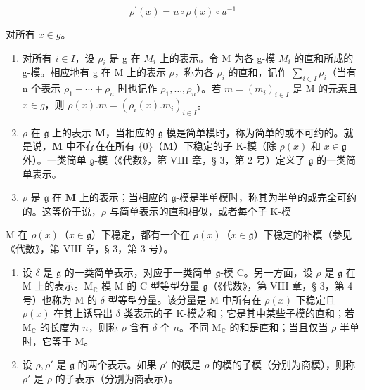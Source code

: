 \[
\rho^ {\prime} (x) = u \circ \rho (x) \circ u ^ {- 1}
\]

对所有 \(x \in g\)。

\begin{enumerate}
\def\labelenumi{(\arabic{enumi})}
\setcounter{enumi}{1}
\item
  对所有 \(i \in I\)，设 \(\rho_{i}\) 是 g 在 \(M_{i}\) 上的表示。令 M 为各 g-模 \(M_{i}\) 的直和所成的 g-模。相应地有 g 在 M 上的表示 \(\rho\)，称为各 \(\rho_{i}\) 的直和，记作 \(\sum_{i\in I}\rho_{i}\)（当有 n 个表示 \(\rho_{1} + \cdots + \rho_{n}\) 时也记作 \(\rho_{1}, \ldots, \rho_{n}\)）。若 \(m = (m_{i})_{i \in I}\) 是 M 的元素且 \(x \in g\)，则 \(\rho(x).m = (\rho_{i}(x).m_{i})_{i \in I}\)。
\item
  \(\rho\) 在 \(\mathfrak{g}\) 上的表示 \(\mathbf{M}\)，当相应的 \(\mathfrak{g}\)-模是简单模时，称为简单的或不可约的。就是说，\(\mathbf{M}\) 中不存在在所有 \(\{0\}\)（\(\mathbf{M}\)）下稳定的子 K-模（除 \(\rho(x)\) 和 \(x \in \mathfrak{g}\) 外）。一类简单 \(\mathfrak{g}\)-模（《代数》，第 VIII 章，§ 3，第 2 号）定义了 \(\mathfrak{g}\) 的一类简单表示。
\item
  \(\rho\) 是 \(\mathfrak{g}\) 在 \(\mathbf{M}\) 上的表示；当相应的 \(\mathfrak{g}\)-模是半单模时，称其为半单的或完全可约的。这等价于说，\(\rho\) 与简单表示的直和相似，或者每个子 K-模
\end{enumerate}

M 在 \(\rho(x)\)（\(x \in \mathfrak{g}\)）下稳定，都有一个在 \(\rho(x)\)（\(x \in \mathfrak{g}\)）下稳定的补模（参见《代数》，第 VIII 章，§ 3，第 3 号）。

\begin{enumerate}
\def\labelenumi{(\arabic{enumi})}
\setcounter{enumi}{4}
\item
  设 \(\delta\) 是 \(\mathfrak{g}\) 的一类简单表示，对应于一类简单 \(\mathfrak{g}\)-模 C。另一方面，设 \(\rho\) 是 \(\mathfrak{g}\) 在 M 上的表示。\(\mathrm{M}_{\mathbb{C}}\)-模 M 的 C 型等型分量 \(\mathfrak{g}\)（《代数》，第 VIII 章，§ 3，第 4 号）也称为 M 的 \(\delta\) 型等型分量。该分量是 M 中所有在 \(\rho(x)\) 下稳定且 \(\rho(x)\) 在其上诱导出 \(\delta\) 类表示的子 K-模之和；它是其中某些子模的直和；若 \(\mathrm{M}_{\mathbb{C}}\) 的长度为 \(n\)，则称 \(\rho\) 含有 \(\delta\) 个 \(n\)。不同 \(\mathrm{M}_{\mathbb{C}}\) 的和是直和；当且仅当 \(\rho\) 半单时，它等于 M。
\item
  设 \(\rho, \rho'\) 是 \(\mathfrak{g}\) 的两个表示。如果 \(\rho'\) 的模是 \(\rho\) 的模的子模（分别为商模），则称 \(\rho'\) 是 \(\rho\) 的子表示（分别为商表示）。
\end{enumerate}

